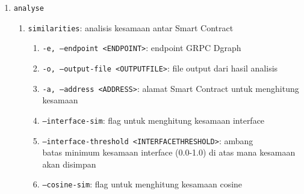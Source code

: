 \begin{enumerate}
	      \begin{enumerate}
		      \item \texttt{-e, --endpoint <ENDPOINT>}: endpoint Ethereum Archive Node \\yang akan dihubungkan dengan skema websocket
		      \item \texttt{-d, --dgraph <DGRAPH>}: endpoint GRPC Dgraph
		      \item \texttt{--include-tx}: flag untuk menyertakan transaksi dalam \textit{streaming}
		      \item \texttt{--include-tokens}: flag untuk menyertakan transfer token dalam \textit{streaming}
		      \item \texttt{--include-logs}: flag untuk menyertakan log dalam \textit{streaming}
		      \item \texttt{--decompiler-timeout <DECOMPILER\textunderscore TIMEOUT>}: waktu maksimal untuk dekompilasi Smart Contract, dalam milliseconds
		      \item \texttt{--no-sync}: flag untuk melewati sinkronisasi dari blok terakhir yang diindeks di Dgraph, hanya mengambil blok live
		      \item \texttt{-n, --num-jobs <NUM\textunderscore JOBS>}: jumlah Tokio \textit{tasks} yang akan dijalankan secara paralel
	      \end{enumerate}
	\item \texttt{analyse}
	      \begin{enumerate}
		      \item \texttt{similarities}: analisis kesamaan antar Smart Contract
		            \begin{enumerate}
			            \item \texttt{-e, --endpoint <ENDPOINT>}: endpoint GRPC Dgraph
			            \item \texttt{-o, --output-file <OUTPUT\textunderscore FILE>}: file output dari hasil analisis
			            \item \texttt{-a, --address <ADDRESS>}: alamat Smart Contract untuk menghitung kesamaan
			            \item \texttt{--interface-sim}: flag untuk menghitung kesamaan interface
			            \item \texttt{--interface-threshold <INTERFACE\textunderscore THRESHOLD>}: ambang \\batas minimum kesamaan interface (0.0-1.0) di atas mana kesamaan akan disimpan
			            \item \texttt{--cosine-sim}: flag untuk menghitung kesamaan cosine

\end{enumerate}
\end{enumerate}
\end{enumerate}
